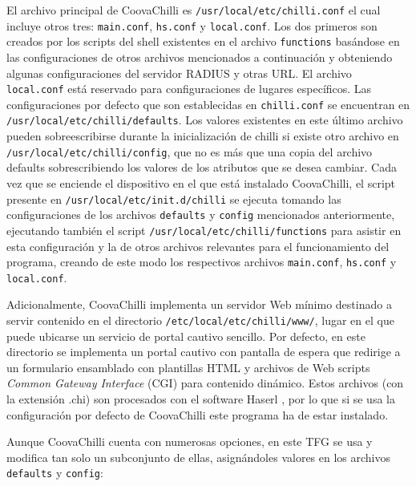 El archivo principal de CoovaChilli es  \verb+/usr/local/etc/chilli.conf+ el cual incluye otros tres: \verb+main.conf+, \verb+hs.conf+ y \verb+local.conf+. Los dos primeros son creados por los scripts del shell existentes en el archivo \verb+functions+ basándose en las configuraciones de otros archivos mencionados a continuación y obteniendo algunas configuraciones del servidor RADIUS y otras \acrshort{URL}. El archivo \verb+local.conf+ está reservado para configuraciones de lugares específicos.
Las configuraciones por defecto que son establecidas en \verb+chilli.conf+ se encuentran en \verb+/usr/local/etc/chilli/defaults+. Los valores existentes en este último archivo pueden sobreescribirse durante la inicialización de chilli si existe otro archivo en \verb+/usr/local/etc/chilli/config+, que no es más que una copia del archivo defaults sobrescribiendo los valores de los atributos que se desea cambiar.
Cada vez que se enciende el dispositivo en el que está instalado CoovaChilli, el script presente en \verb+/usr/local/etc/init.d/chilli+ se ejecuta tomando las configuraciones de los archivos \verb+defaults+ y \verb+config+ mencionados anteriormente, ejecutando también el script \verb+/usr/local/etc/chilli/functions+ para asistir en esta configuración y la de otros archivos relevantes para el funcionamiento del programa, creando de este modo los respectivos archivos \verb+main.conf+, \verb+hs.conf+ y \verb+local.conf+.

Adicionalmente, CoovaChilli implementa un servidor Web mínimo destinado a servir contenido en el directorio \verb+/etc/local/etc/chilli/www/+, lugar en el que puede ubicarse un servicio de portal cautivo sencillo. Por defecto, en este directorio se implementa un portal cautivo con pantalla de espera que redirige a un formulario ensamblado con plantillas HTML y archivos de Web scripts \emph{Common Gateway Interface} (\acrshort{CGI}) para contenido dinámico. Estos archivos (con la extensión .chi) son procesados con el software Haserl \cite{Haserl}, por lo que si se usa la configuración por defecto de CoovaChilli este programa ha de estar instalado.

Aunque CoovaChilli cuenta con numerosas opciones, en este TFG se usa y modifica tan solo un subconjunto de ellas, asignándoles valores en los archivos \verb+defaults+ y \verb+config+:

